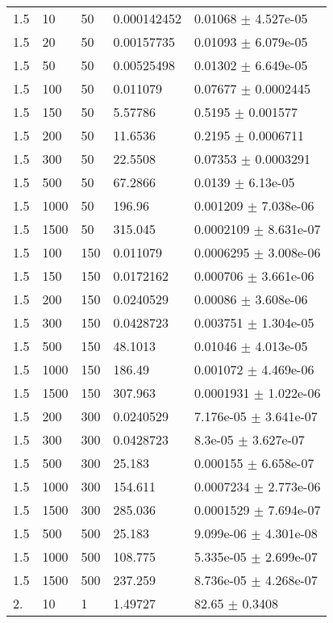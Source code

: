\begin{longtable}{lllll}
 1.5 &    10 &    50 & 0.000142452 &  0.01068 $\pm$ 4.527e-05 \\
 1.5 &    20 &    50 & 0.00157735 &  0.01093 $\pm$ 6.079e-05 \\
 1.5 &    50 &    50 & 0.00525498 &  0.01302 $\pm$ 6.649e-05 \\
 1.5 &   100 &    50 & 0.011079 &  0.07677 $\pm$ 0.0002445 \\
 1.5 &   150 &    50 &  5.57786 &   0.5195 $\pm$ 0.001577 \\
 1.5 &   200 &    50 &  11.6536 &   0.2195 $\pm$ 0.0006711 \\
 1.5 &   300 &    50 &  22.5508 &  0.07353 $\pm$ 0.0003291 \\
 1.5 &   500 &    50 &  67.2866 &   0.0139 $\pm$ 6.13e-05 \\
 1.5 &  1000 &    50 &   196.96 & 0.001209 $\pm$ 7.038e-06 \\
 1.5 &  1500 &    50 &  315.045 & 0.0002109 $\pm$ 8.631e-07 \\
 1.5 &   100 &   150 & 0.011079 & 0.0006295 $\pm$ 3.008e-06 \\
 1.5 &   150 &   150 & 0.0172162 & 0.000706 $\pm$ 3.661e-06 \\
 1.5 &   200 &   150 & 0.0240529 &  0.00086 $\pm$ 3.608e-06 \\
 1.5 &   300 &   150 & 0.0428723 & 0.003751 $\pm$ 1.304e-05 \\
 1.5 &   500 &   150 &  48.1013 &  0.01046 $\pm$ 4.013e-05 \\
 1.5 &  1000 &   150 &   186.49 & 0.001072 $\pm$ 4.469e-06 \\
 1.5 &  1500 &   150 &  307.963 & 0.0001931 $\pm$ 1.022e-06 \\
 1.5 &   200 &   300 & 0.0240529 & 7.176e-05 $\pm$ 3.641e-07 \\
 1.5 &   300 &   300 & 0.0428723 &  8.3e-05 $\pm$ 3.627e-07 \\
 1.5 &   500 &   300 &   25.183 & 0.000155 $\pm$ 6.658e-07 \\
 1.5 &  1000 &   300 &  154.611 & 0.0007234 $\pm$ 2.773e-06 \\
 1.5 &  1500 &   300 &  285.036 & 0.0001529 $\pm$ 7.694e-07 \\
 1.5 &   500 &   500 &   25.183 & 9.099e-06 $\pm$ 4.301e-08 \\
 1.5 &  1000 &   500 &  108.775 & 5.335e-05 $\pm$ 2.699e-07 \\
 1.5 &  1500 &   500 &  237.259 & 8.736e-05 $\pm$ 4.268e-07 \\
  2. &    10 &     1 &  1.49727 &    82.65 $\pm$   0.3408 \\

\end{longtable}
